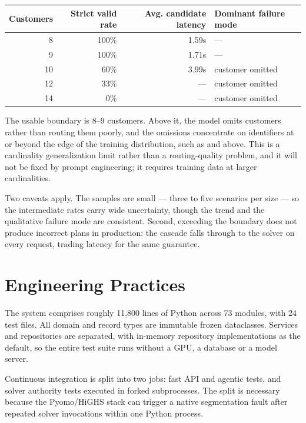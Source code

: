 \documentclass[11pt,a4paper]{article}
\newcommand{\toprule}{\hline}
\newcommand{\midrule}{\hline}
\newcommand{\bottomrule}{\hline}
\begin{document}
\begin{table}[h]
\centering
\begin{tabular}{rrrl}
\toprule
Customers & Strict valid rate & Avg. candidate latency & Dominant failure mode \\
\midrule
8  & 100\% & 1.59s & --- \\
9  & 100\% & 1.71s & --- \\
10 & 60\%  & 3.99s & customer omitted \\
12 & 33\%  & --- & customer omitted \\
14 & 0\%   & --- & customer omitted \\
\bottomrule
\end{tabular}
\end{table}

The usable boundary is 8--9 customers. Above it, the model omits customers rather than routing them
poorly, and the omissions concentrate on identifiers at or beyond the edge of the training
distribution, such as  and above. This is a cardinality generalization limit rather than a
routing-quality problem, and it will not be fixed by prompt engineering; it requires training data at
larger cardinalities.

Two caveats apply. The samples are small --- three to five scenarios per size --- so the intermediate
rates carry wide uncertainty, though the trend and the qualitative failure mode are consistent.
Second, exceeding the boundary does not produce incorrect plans in production: the cascade falls
through to the solver on every request, trading latency for the same guarantee.

\section{Engineering Practices}

The system comprises roughly 11,800 lines of Python across 73 modules, with 24 test files. All
domain and record types are immutable frozen dataclasses. Services and repositories are separated,
with in-memory repository implementations as the default, so the entire test suite runs without a
GPU, a database or a model server.

Continuous integration is split into two jobs: fast API and agentic tests, and solver authority tests
executed in forked subprocesses. The split is necessary because the Pyomo/HiGHS stack can trigger a
native segmentation fault after repeated solver invocations within one Python process.
\end{document}
